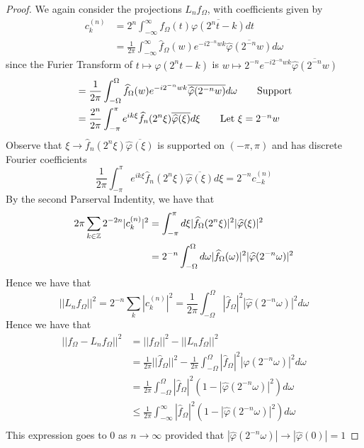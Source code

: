 \documentclass{article}
\begin{document}
{\begin{proof}
    We again consider the projections $L_n f_\Omega$, with coefficients given by
    \begin{align*}
        c_{k}^{(n)} &= 2^n \int_{-\infty}^{\infty} f_\Omega(t) \overline{\varphi(2^n t - k)} dt\\
        &= \frac{1}{2\pi} \int_{-\infty}^{\infty} \widehat{f}_\Omega(w)  e^{-i2^{-n} w k} \overline{\widehat{\varphi}(2^{-n} w)}  d\omega \tag*{Parsevral}
    \end{align*}
    since the Furier Transform of $t \mapsto \varphi(2^n t - k)$ is $w \mapsto 2^{-n} e^{-i2^{-n} w k} \overline{\widehat{\varphi}(2^{-n} w)} $
    \begin{align*}
        &= \frac{1}{2\pi} \int_{-\Omega}^{\Omega} \widehat{f}_\Omega(w)  e^{-i2^{-n} w k} \overline{\widehat{\varphi}(2^{-n} w)} d\omega \tag*{Support}\\
        &= \frac{2^n}{2\pi} \int_{-\pi}^{\pi} e^{ik\xi} \widehat{f}_n(2^n \xi) \overline{\widehat{\varphi}(\xi)} d\xi\tag*{Let $\xi = 2^{-n} w$}
    \end{align*}
    Observe that $\xi \to \widehat{f}_n(2^n \xi) \overline{\widehat{\varphi}(\xi)}$ is supported on $(-\pi, \pi)$ and has discrete Fourier coefficients
    \[\frac{1}{2\pi} \int_{-\pi}^{\pi} e^{ik\xi} \widehat{f}_n(2^n \xi) \overline{\widehat{\varphi}(\xi)} d\xi = 2^{-n} c_{-k}^{(n)}\]
    By the second Parserval Indentity, we have that
    \begin{align*}
        2\pi \sum_{k \in \mathbb{Z}} 2^{-2n} |c_k^{(n)}|^2 &= \int_{-\pi}^{\pi} d\xi |\widehat{f}_\Omega(2^n \xi)|^2 |\widehat{\varphi}(\xi)|^2\\
        &= 2^{-n} \int_{-\Omega}^{\Omega} d\omega |\widehat{f}_\Omega(\omega)|^2 |\widehat{\varphi}(2^{-n} \omega)|^2
    \end{align*}
    Hence we have that
    \[||L_n f_\Omega||^2 = 2^{-n} \sum_{k} |c_k^{(n)}|^2 = \frac{1}{2\pi} \int_{-\Omega}^{\Omega} |\widehat{f}_\Omega|^2 |\widehat{\varphi}(2^{-n} \omega)|^2 d\omega\]
    Hence we have that
    \begin{align*}
        ||f_\Omega - L_n f_\Omega||^2 &= ||f_\Omega||^2 - ||L_n f_\Omega||^2\\
        &= \frac{1}{2\pi} ||\widehat{f}_\Omega||^2 - \frac{1}{2\pi} \int_{-\Omega}^{\Omega} |\widehat{f}_\Omega|^2 |\widehat{\varphi}(2^{-n} \omega)|^2 d\omega\\
        &= \frac{1}{2\pi} \int_{-\Omega}^{\Omega} |\widehat{f}_\Omega|^2 (1 - |\widehat{\varphi}(2^{-n} \omega)|^2) d\omega\\
        &\leq \frac{1}{2\pi} \int_{-\infty}^{\infty} |\widehat{f}_\Omega|^2 (1 - |\widehat{\varphi}(2^{-n} \omega)|^2) d\omega\\
    \end{align*}
    This expression goes to $0$ as $n \to \infty$ provided that $|\widehat{\varphi}(2^{-n} \omega)| \to |\widehat{\varphi}(0)| = 1$
\end{proof}

}
\end{document}
